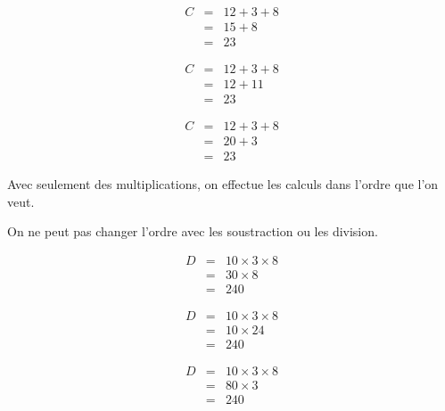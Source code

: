 \documentclass[a4paper,10pt]{report}
\begin{document}
\begin{ex} 

\vspace{-1cm} \hspace{2.5cm}
\begin{minipage}{5cm}
\begin{eqnarray*}
C &=& 12 + 3 + 8 \\
&=& 15 + 8 \\
&=& 23
\end{eqnarray*}
\end{minipage}
\begin{minipage}{5cm}
\begin{eqnarray*}
C &=& 12 + 3 + 8 \\
&=& 12 + 11 \\
&=& 23
\end{eqnarray*}
\end{minipage}
\begin{minipage}{5cm}
\begin{eqnarray*}
C &=& 12 + 3 + 8 \\
&=& 20 + 3 \\
&=& 23
\end{eqnarray*}
\end{minipage}
\end{ex}

\begin{regle}
Avec seulement des multiplications, on effectue les calculs dans l'ordre que l'on veut.
\end{regle}

\begin{rmq}
On ne peut pas changer l'ordre avec les soustraction ou les division.
\end{rmq}

\begin{ex}

\vspace{-1cm} \hspace{2.5cm}
\begin{minipage}{5cm}

\begin{eqnarray*}
D &=& 10 \times 3 \times 8 \\
&=& 30 \times 8 \\
&=& 240
\end{eqnarray*}
\end{minipage}
\begin{minipage}{5cm}
\begin{eqnarray*}
D &=& 10 \times 3 \times 8 \\
&=& 10 \times 24 \\
&=& 240
\end{eqnarray*}
\end{minipage}
\begin{minipage}{5cm}
\begin{eqnarray*}
D &=& 10 \times 3 \times 8 \\
&=& 80 \times 3 \\
&=& 240
\end{eqnarray*}
\end{minipage}
\end{ex}
\end{document}
